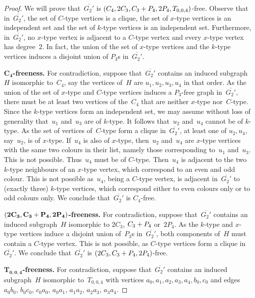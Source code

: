 \documentclass{llncs}
\begin{document}
\begin{proof}
We will prove that~$\overline{G_2'}$ is $(C_4,2C_3,C_3+\nobreak P_4,2P_4,T_{0,0,4})$-free.
Observe that in~$\overline{G_2'}$, the set of $C$-type vertices is a clique, the set of $x$-type vertices is an independent set and the set of $k$-type vertices is an independent set.
Furthermore, in~$\overline{G_2'}$, no $x$-type vertex is adjacent to a $C$-type vertex and every $x$-type vertex has degree~$2$.
In fact, the union of the set of $x$-type vertices and the $k$-type vertices induces a disjoint union of $P_3$s in~$\overline{G_2'}$.

\medskip
\noindent
{\bf $\mathbf{C_4}$-freeness.}
For contradiction, suppose that~$\overline{G_2'}$ contains an induced subgraph~$H$ isomorphic to~$C_4$, say the vertices of~$H$ are $u_1,u_2,u_3,u_4$ in that order.
As the union of the set of $x$-type and $C$-type vertices induces a $P_3$-free graph in~$\overline{G_2'}$, there must be at least two vertices of the~$C_4$ that are neither $x$-type nor~$C$-type.
Since the $k$-type vertices form an independent set, we may assume without loss of generality that~$u_1$ and~$u_3$ are of $k$-type.
It follows that~$u_2$ and~$u_4$ cannot be of $k$-type.
As the set of vertices of~$C$-type form a clique in~$\overline{G_2'}$, at least one of $u_2,u_4$, say~$u_2$, is of $x$-type.
If~$u_4$ is also of $x$-type, then~$u_2$ and~$u_4$ are $x$-type vertices with the same two colours in their list, namely those corresponding to~$u_1$ and~$u_3$.
This is not possible.
Thus~$u_4$ must be of $C$-type.
Then~$u_4$ is adjacent to the two $k$-type neighbours of an $x$-type vertex, which correspond to an even and odd colour.
This is not possible as~$u_4$, being a $C$-type vertex, is adjacent in~$\overline{G_2'}$ to (exactly three) $k$-type vertices, which correspond either to even colours only or to odd colours only.
We conclude that~$\overline{G_2'}$ is $C_4$-free.

\medskip
\noindent
{\bf $\mathbf{(2C_3,C_3+\nobreak P_4,2P_4)}$-freeness.}
For contradiction, suppose that~$\overline{G_2'}$ contains an induced subgraph~$H$ isomorphic to $2C_3$, $C_3+\nobreak P_4$ or~$2P_4$.
As the $k$-type and $x$-type vertices induce a disjoint union of~$P_3$s in~$\overline{G_2'}$, both components of~$H$ must contain a $C$-type vertex.
This is not possible, as $C$-type vertices form a clique in~$\overline{G_2'}$.
We conclude that~$\overline{G_2'}$ is $(2C_3,C_3+\nobreak P_4,2P_4)$-free.

\medskip
\noindent
{\bf $\mathbf{T_{0,0,4}}$-freeness.}
For contradiction, suppose that~$\overline{G_2'}$ contains an induced subgraph~$H$ isomorphic to~$T_{0,0,4}$ with vertices $a_0,a_1,a_2,a_3,a_4,b_0,c_0$ and edges $a_0b_0$, $b_0c_0$, $c_0a_0$, $a_0a_1$, $a_1a_2$, $a_2a_3$, $a_3a_4$.


\end{proof}
\end{document}
